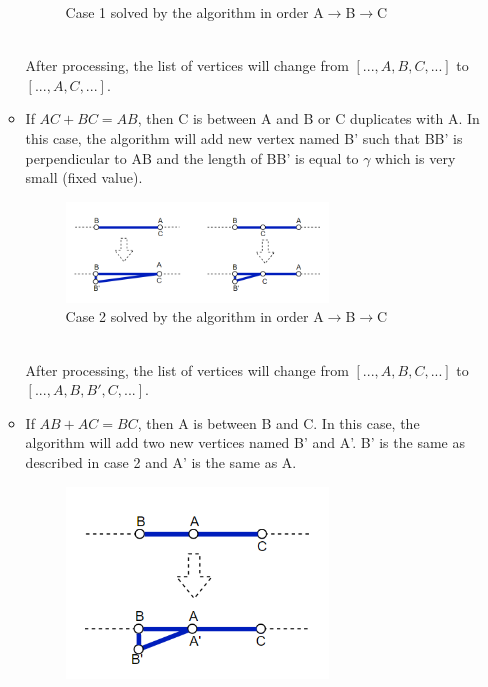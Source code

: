 \documentclass[13pt,a4paper]{article}
\begin{document}
\begin{itemize}
\begin{itemize}
\begin{figure}[!h]
						\caption{Case 1 solved by the algorithm in order A$\rightarrow$B$\rightarrow$C}
					\end{figure} \\
					After processing, the list of vertices will change from $[..., A, B, C, ...]$ to $[..., A, C, ...]$.
					\item If $AC + BC = AB$, then C is between A and B or C duplicates with A. In this case, the algorithm will add new vertex named B' such that BB' is perpendicular to AB and the length of BB' is equal to $\gamma$ which is very small (fixed value). \\
					\begin{figure}[!h]
						\centering                                 \includegraphics[width=0.7\textwidth]{Robot_Global_Vision_Update/RGVU_preprocess_case2.png}
						\caption{Case 2 solved by the algorithm in order A$\rightarrow$B$\rightarrow$C}
					\end{figure} \\
					After processing, the list of vertices will change from $[..., A, B, C, ...]$ to $[..., A, B, B', C, ...]$.
					\item If $AB + AC = BC$, then A is between B and C. In this case, the algorithm will add two new vertices named B' and A'. B' is the same as described in case 2 and A' is the same as A.\\
					\begin{figure}[!h]
						\centering                                 \includegraphics[width=0.7\textwidth]{Robot_Global_Vision_Update/RGVU_preprocess_case3.png}

\end{figure}
\end{itemize}
\end{itemize}
\end{document}
